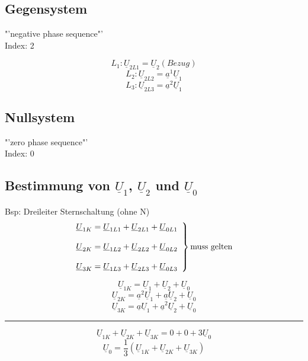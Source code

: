 \documentclass[a4,paper,fleqn]{article}
\begin{document}
\subsection{Gegensystem}
"'negative phase sequence"' \\
Index: 2 \\
\[ L_1: \underline{U}_{2L1} = \underline{U}_2 (Bezug) \]
\[ L_2: \underline{U}_{2L2} = \underline{a}^1 \underline{U}_1 \]
\[ L_3: \underline{U}_{2L3} = \underline{a}^2 \underline{U}_1 \]

\subsection{Nullsystem}
"'zero phase sequence"' \\
Index: 0 \\

\subsection{Bestimmung von $\underline{U}_1$, $\underline{U}_2$ und $\underline{U}_0$}
Bsp: Dreileiter Sternschaltung (ohne N) \\
\[
\left.
\begin{array}{@{}l}
\underline{U}_{1K} = \underline{U}_{1L1} + \underline{U}_{2L1} + \underline{U}_{0L1} \\\\
\underline{U}_{2K} = \underline{U}_{1L2} + \underline{U}_{2L2} + \underline{U}_{0L2} \\\\
\underline{U}_{3K} = \underline{U}_{1L3} + \underline{U}_{2L3} + \underline{U}_{0L3}
\end{array}
\right\rbrace \text{muss gelten}
\]

\[ \underline{U}_{1K} = \underline{U}_{1} + \underline{U}_{2} + \underline{U}_{0} \]
\[ \underline{U}_{2K} = \underline{a}^2 \underline{U}_{1} + \underline{a} \underline{U}_{2} + \underline{U}_{0} \]
\[ \underline{U}_{3K} = \underline{a} \underline{U}_{1} + \underline{a}^2 \underline{U}_{2} + \underline{U}_{0} \]
\rule{10cm}{0.5pt}
\[ \underline{U}_{1K} + \underline{U}_{2K} + \underline{U}_{3K} = 0 + 0 + 3 \underline{U}_{0} \]
\[ \boxed{\underline{U}_{0} = \frac{1}{3} \left(\underline{U}_{1K} + \underline{U}_{2K} + \underline{U}_{3K}\right)} \]
\end{document}
